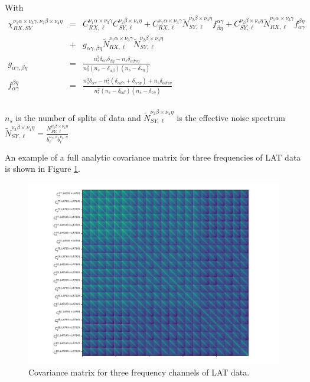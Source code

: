 \documentclass[a4paper, 11pt]{article}
\def\ba{\begin{eqnarray}}
\def\ea{\end{eqnarray}}
\begin{document}
With 
\ba
 \chi_{RX,SY}^{\nu_{1} \alpha \times \nu_{3} \gamma, \nu_{2} \beta \times  \nu_{4} \eta} &=&  C^{\nu_{1} \alpha \times \nu_{3} \gamma}_{RX, \ell}   C^{ \nu_{2} \beta \times  \nu_{4} \eta}_{SY, \ell} +  C^{\nu_{1} \alpha \times \nu_{3} \gamma}_{RX, \ell}  \tilde{N}^{ \nu_{2} \beta \times  \nu_{4} \eta}_{SY, \ell}  f^{\alpha \gamma}_{\beta \eta} + C^{ \nu_{2} \beta \times  \nu_{4} \eta}_{SY, \ell} \tilde{N}^{\nu_{1} \alpha \times \nu_{3} \gamma}_{RX, \ell}   f^{\beta \eta}_{\alpha \gamma} \nonumber \\ & +&  g_{\alpha \gamma, \beta \eta} \tilde{N}^{\nu_{1} \alpha \times  \nu_{3} \gamma}_{RX, \ell}\tilde{N}^{ \nu_{2} \beta \times  \nu_{4} \eta}_{SY, \ell} \nonumber \\
g_{\alpha \gamma, \beta \eta} &=& \frac{n^{2}_{s} \delta_{\alpha \gamma}\delta_{\beta \eta} -n_{s} \delta_{\alpha \beta \gamma \eta}}{n^{2}_{s}(n_{s} -\delta_{\alpha \beta}) (n_{s} -\delta_{\gamma \eta})} \nonumber \\
 f^{\beta \eta}_{\alpha \gamma}  &=& \frac{n^{3}_{s}\delta_{\alpha \gamma}- n^{2}_{s}( \delta_{\alpha \beta \gamma} + \delta_{\alpha  \gamma \eta}) + n_{s} \delta_{\alpha \beta \gamma \eta}}{n^{2}_{s}(n_{s} -\delta_{\alpha \beta}) (n_{s} -\delta_{\gamma \eta})} \nonumber\\
\ea

$n_{s}$ is the number of splits of data and $\tilde{N}^{ \nu_{2} \beta \times  \nu_{4} \eta}_{SY, \ell}$ is the effective noise spectrum $ \tilde{N}^{ \nu_{2} \beta \times  \nu_{4} \eta}_{SY, \ell} = \frac{N^{ \nu_{2} \beta \times  \nu_{4} \eta}_{SY, \ell}}{ b_{\ell}^{\nu_{2}, \beta} b_{\ell}^{\nu_{3}, \eta} }$

An example of a full analytic covariance matrix for three frequencies of LAT data is shown in Figure \ref{fig:cov}.

\begin{figure}
  \centering
  \includegraphics[width=1 \textwidth]{covariance.png}
  \caption{Covariance matrix for three frequency channels of LAT data.}
  \label{fig:cov}
\end{figure}
\end{document}
